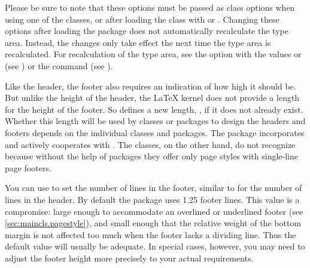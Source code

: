 Please be sure to note that these options must be passed
as class options when using one of the {\KOMAScript} classes, or after loading
the class with  or
. Changing these options after loading the
 package does not
automatically recalculate the type area. Instead, the changes only take effect
the next time the type area is recalculated. For recalculation of the type
area, see the \hyperref[desc:\LabelBase.option.DIV.last]{} option
with the values \hyperref[desc:\LabelBase.option.DIV.last]{} or
\hyperref[desc:\LabelBase.option.DIV.current]{} (see
) or the
 command (see
).%
%
\EndIndexGroup


\begin{Declaration}
\end{Declaration}
%
Like the header, the footer also requires
an indication of how high it should be. But unlike the height of the header,
the \LaTeX{} kernel does not provide a length for the height of the footer. So
 defines a new length,
, if it does not already
exist. Whether this length will be used by classes or packages to design the
headers and footers depends on the individual classes and packages. The
\KOMAScript{} package
\hyperref[cha:scrlayer-scrpage]{}%
%
 incorporates
 and actively cooperates with . The
\KOMAScript{} classes, on the other hand, do not recognize 
because without the help of packages they offer only page styles with
single-line page footers.

You can use  to set the number
of lines in the footer, similar to  for
the number of lines in the header. By default the  package
uses 1.25 footer lines. This value is a compromise: large enough to
accommodate an overlined or underlined footer (see
\autoref{sec:maincls.pagestyle}), and small enough that the relative weight of
the bottom margin is not affected too much when the footer lacks a dividing
line. Thus the default value will usually be adequate. In special cases,
however, you may need to adjust the footer height more precisely to your
actual requirements.

